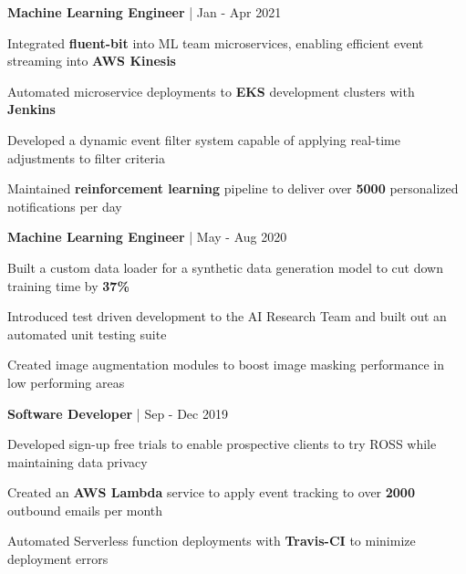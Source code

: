 \begin{cventries}
\cventry
{\textbf{Machine Learning Engineer} | \color{awesome}{Zynga}}
{Jan - Apr 2021} %
{ %
\begin{cvitems}
\item{Integrated \textbf{fluent-bit} into ML team microservices, enabling efficient event streaming into \textbf{AWS Kinesis}}
\item {Automated microservice deployments to \textbf{EKS} development clusters with \textbf{Jenkins}}
\item{Developed a dynamic event filter system capable of applying real-time adjustments to filter criteria}
\item {Maintained \textbf{reinforcement learning} pipeline to deliver over \textbf{5000} personalized notifications per day}
\end{cvitems}
}


\cventry
{\textbf{Machine Learning Engineer} | \color{awesome}{PerkinElmer}}
{May - Aug 2020} %
{ %
\begin{cvitems}
\item {Built a custom data loader for a synthetic data generation model to cut down training time by \textbf{37\%}}
\item {Introduced test driven development to the AI Research Team and built out an automated unit testing suite}
\item {Created image augmentation modules to boost image masking performance in low performing areas}
\end{cvitems}
}


\cventry
{\textbf{Software Developer} | \color{awesome}{ROSS Intelligence}}
{Sep - Dec 2019} %
{ %
\begin{cvitems}
\item {Developed sign-up free trials to enable prospective clients to try ROSS while maintaining data privacy}
\item {Created an \textbf{AWS Lambda} service to apply event tracking to over \textbf{2000} outbound emails per month}
\item {Automated Serverless function deployments with \textbf{Travis-CI} to minimize deployment errors}
\end{cvitems}
}


\end{cventries}
